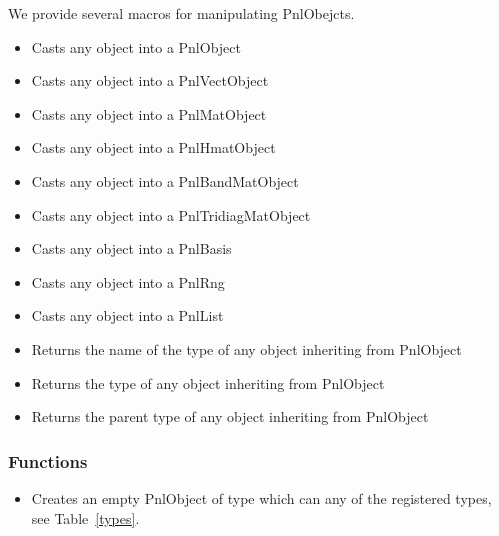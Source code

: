 We provide several macros for manipulating PnlObejcts.
\begin{itemize}
\item {}
  \sshortdescribe Casts any object into a PnlObject

\item {}
  \sshortdescribe Casts any object into a PnlVectObject

\item {}
  \sshortdescribe Casts any object into a PnlMatObject

\item {}
  \sshortdescribe Casts any object into a PnlHmatObject

\item {}
  \sshortdescribe Casts any object into a PnlBandMatObject

\item {}
  \sshortdescribe Casts any object into a PnlTridiagMatObject

\item {}
  \sshortdescribe Casts any object into a PnlBasis

\item {}
  \sshortdescribe Casts any object into a PnlRng

\item {}
  \sshortdescribe Casts any object into a PnlList

\item {}
  \sshortdescribe Returns the name of the type of any object inheriting from PnlObject

\item {}
  \sshortdescribe Returns the type of any object inheriting from PnlObject
  
\item {}
  \sshortdescribe Returns the parent type of any object inheriting from PnlObject
\end{itemize}

\subsubsection{Functions}

\begin{itemize}
\item {}
  \sshortdescribe Creates an empty PnlObject of type  which can any of
  the registered types, see Table~\ref{types}.
\end{itemize}

